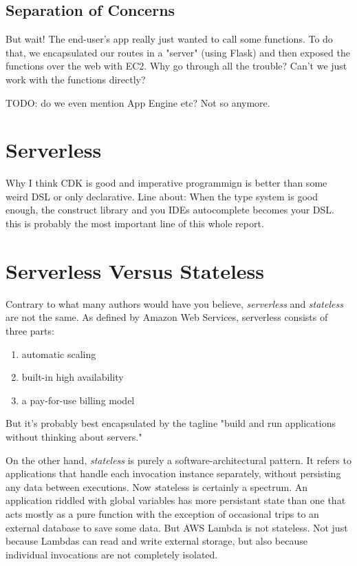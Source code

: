 \documentclass{article}
\newcommand{\term}[1]{\textit{#1}\index{#1}}
\newcommand{\newp}{\newline\indent}
\begin{document}
\subsection {Separation of Concerns}

But wait!
The end-user's app really just wanted to call some functions.
To do that, we encapsulated our routes in a "server" (using Flask) and then exposed the functions over the web with EC2.
Why go through all the trouble?
Can't we just work with the functions directly?

TODO: do we even mention App Engine etc?
\newp Not so anymore.


\section{Serverless}

Why I think CDK is good and imperative programmign is better than some weird DSL or only declarative.
Line about:
When the type system is good enough, the construct library and you IDEs autocomplete becomes your DSL.
this is probably the most important line of this whole report.

\section{Serverless Versus Stateless}

Contrary to what many authors would have you believe, \term{serverless} and \term{stateless} are not the same.
As defined by Amazon Web Services, serverless consists of three parts:

\begin{enumerate}
    \item automatic scaling
    \item built-in high availability
    \item a pay-for-use billing model
\end{enumerate}

But it's probably best encapsulated by the tagline "build and run applications without thinking about servers."

On the other hand, \textit{stateless} is purely a software-architectural pattern.
It refers to applications that handle each invocation instance separately, without persisting any data between executions.
Now \term stateless is certainly a spectrum.
An application riddled with global variables has more persistant state than one that acts mostly as a pure function with the exception of occasional trips to an external database to save some data.
But AWS Lambda is not stateless.
Not just because Lambdas can read and write external storage, but also because individual invocations are not completely isolated.
\end{document}
